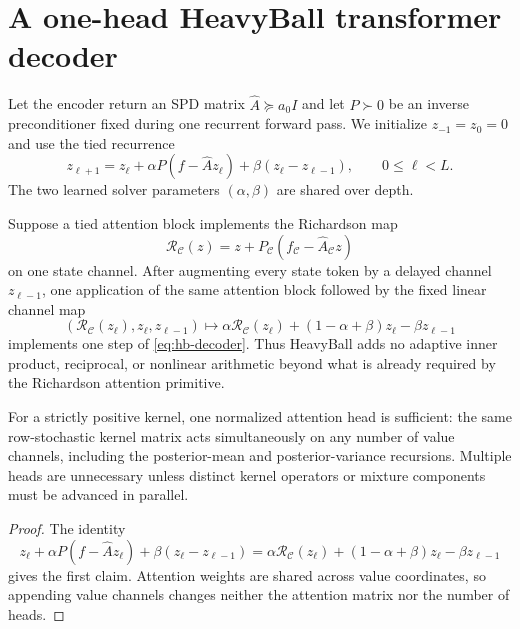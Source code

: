 
\section{A one-head HeavyBall transformer decoder}
\label{sec:heavyball-decoder}

Let the encoder return an SPD matrix $\widehat A\succeq a_0 I$ and let
$P\succ0$ be an inverse preconditioner fixed during one recurrent forward
pass.  We initialize $z_{-1}=z_0=0$ and use the tied recurrence
\begin{equation}
 z_{\ell+1}
 =z_\ell+\alpha P(f-\widehat A z_\ell)
 +\beta(z_\ell-z_{\ell-1}),
 \qquad 0\leq \ell<L.
 \label{eq:hb-decoder}
\end{equation}
The two learned solver parameters $(\alpha,\beta)$ are shared over depth.

\begin{proposition}
\label{prop:one-head-hb}
Suppose a tied attention block implements the Richardson map
\[
 \mathcal R_{\mathcal C}(z)
 =z+P_{\mathcal C}(f_{\mathcal C}-\widehat A_{\mathcal C}z)
\]
on one state channel.  After augmenting every state token by a delayed channel
$z_{\ell-1}$, one application of the same attention block followed by the
fixed linear channel map
\[
 (\mathcal R_{\mathcal C}(z_\ell),z_\ell,z_{\ell-1})
 \longmapsto
 \alpha\mathcal R_{\mathcal C}(z_\ell)
 +(1-\alpha+\beta)z_\ell-\beta z_{\ell-1}
\]
implements one step of \eqref{eq:hb-decoder}.  Thus HeavyBall adds no adaptive
inner product, reciprocal, or nonlinear arithmetic beyond what is already
required by the Richardson attention primitive.

For a strictly positive kernel, one normalized attention head is sufficient:
the same row-stochastic kernel matrix acts simultaneously on any number of
value channels, including the posterior-mean and posterior-variance
recursions.  Multiple heads are unnecessary unless distinct kernel operators
or mixture components must be advanced in parallel.
\end{proposition}

\begin{proof}
The identity
\[
 z_\ell+\alpha P(f-\widehat A z_\ell)
 +\beta(z_\ell-z_{\ell-1})
 =\alpha\mathcal R_{\mathcal C}(z_\ell)
 +(1-\alpha+\beta)z_\ell-\beta z_{\ell-1}
\]
gives the first claim.  Attention weights are shared across value coordinates,
so appending value channels changes neither the attention matrix nor the
number of heads.
\end{proof}

